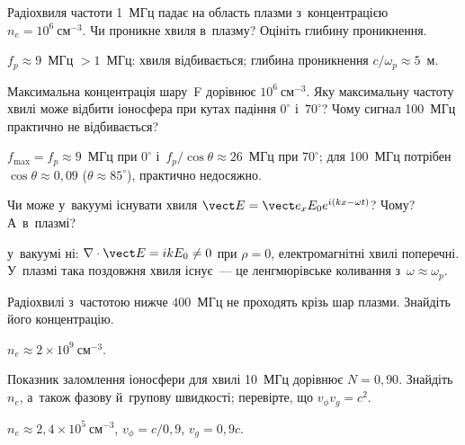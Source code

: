 \begin{problem}\label{prb:PlasmaWave}
	Радіохвиля частоти 1~МГц падає на область плазми з~концентрацією
	$n_e=10^6~\mathrm{см}^{-3}$. Чи проникне хвиля в~плазму? Оцініть глибину проникнення.
	\begin{solution}
		$f_p\approx9$~МГц $>1$~МГц: хвиля відбивається; глибина проникнення $c/\omega_p\approx5$~м.
	\end{solution}
\end{problem}

\begin{problem}\label{prb:PlasmaIonosphere}
	Максимальна концентрація шару~F дорівнює $10^6~\mathrm{см}^{-3}$. Яку максимальну
	частоту хвилі може відбити іоносфера при кутах падіння $0^\circ$ і~$70^\circ$? Чому
	сигнал 100~МГц практично не відбивається?
	\begin{solution}
		$f_{\max}=f_p\approx9$~МГц при $0^\circ$ і~$f_p/\cos\theta\approx26$~МГц при $70^\circ$; для 100~МГц потрібен $\cos\theta\approx0{,}09$ ($\theta\approx85^\circ$), практично недосяжно.
	\end{solution}
\end{problem}

\begin{problem}\label{prb:LongitudinalWave}
	Чи може у~вакуумі існувати хвиля $\vect E=\vect e_xE_0e^{i(kx-\omega t)}$? Чому? А~в~плазмі?
	\begin{solution}
		у~вакуумі ні: $\nabla\cdot\vect E=ikE_0\neq0$ при $\rho=0$, електромагнітні хвилі поперечні.
	У~плазмі така поздовжня хвиля існує~--- це ленгмюрівське коливання з~$\omega\approx\omega_p$.
	\end{solution}
\end{problem}

\begin{problem}\label{prb:CutoffDensity}
	Радіохвилі з~частотою нижче $400$~МГц не проходять крізь шар плазми. Знайдіть його концентрацію.
	\begin{solution}
		$n_e\approx2\times10^{9}~\text{см}^{-3}$.
	\end{solution}
\end{problem}

\begin{problem}\label{prb:IonosphereIndex}
	Показник заломлення іоносфери для хвилі 10~МГц дорівнює $N=0{,}90$. Знайдіть $n_e$, а~також
	фазову й~групову швидкості; перевірте, що $v_{\phi}v_{g}=c^2$.
	\begin{solution}
		$n_e\approx2{,}4\times10^{5}~\text{см}^{-3}$, $v_\phi=c/0{,}9$, $v_g=0{,}9c$.
	\end{solution}
\end{problem}

